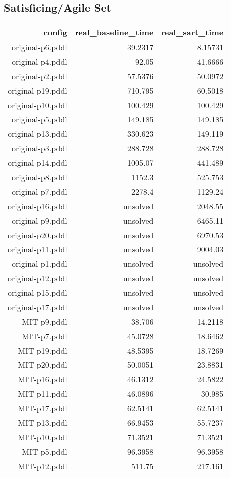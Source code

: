 \documentclass{article}
\begin{document}
                    \subsection*{Satisficing/Agile Set}
                    
                            \begin{center}
                            \scriptsize
                            \begin{tabular}{r|r|r}
                            config & real\_baseline\_time & real\_sart\_time\\\midrule
                             original-p6.pddl&39.2317&8.15731\\
 original-p4.pddl&92.05&41.6666\\
 original-p2.pddl&57.5376&50.0972\\
 original-p19.pddl&710.795&60.5018\\
 original-p10.pddl&100.429&100.429\\
 original-p5.pddl&149.185&149.185\\
 original-p13.pddl&330.623&149.119\\
 original-p3.pddl&288.728&288.728\\
 original-p14.pddl&1005.07&441.489\\
 original-p8.pddl&1152.3&525.753\\
 original-p7.pddl&2278.4&1129.24\\
 original-p16.pddl&unsolved&2048.55\\
 original-p9.pddl&unsolved&6465.11\\
 original-p20.pddl&unsolved&6970.53\\
 original-p11.pddl&unsolved&9004.03\\
 original-p1.pddl&unsolved&unsolved\\
 original-p12.pddl&unsolved&unsolved\\
 original-p15.pddl&unsolved&unsolved\\
 original-p17.pddl&unsolved&unsolved\\
 MIT-p9.pddl&38.706&14.2118\\
 MIT-p7.pddl&45.0728&18.6462\\
 MIT-p19.pddl&48.5395&18.7269\\
 MIT-p20.pddl&50.0051&23.8831\\
 MIT-p16.pddl&46.1312&24.5822\\
 MIT-p11.pddl&46.0896&30.985\\
 MIT-p17.pddl&62.5141&62.5141\\
 MIT-p13.pddl&66.9453&55.7237\\
 MIT-p10.pddl&71.3521&71.3521\\
 MIT-p5.pddl&96.3958&96.3958\\
 MIT-p12.pddl&511.75&217.161
                            \end{tabular}
                            \end{center}
                    
\end{document}
